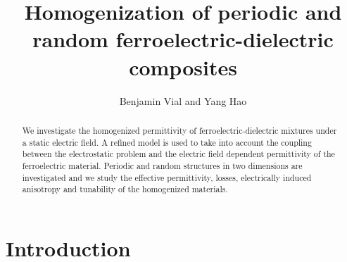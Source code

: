 \documentclass[%
 reprint,
 amsmath,amssymb,
 aps,
]{revtex4-2}
\begin{document}
\title{Homogenization of periodic and random ferroelectric-dielectric composites}


\author{Benjamin Vial and Yang Hao}



\begin{abstract}
We investigate the homogenized permittivity of ferroelectric-dielectric mixtures under
a static electric field. A refined model is used to take into account the coupling
between the electrostatic problem and the electric field dependent permittivity of the
ferroelectric material. Periodic and random structures in two dimensions are investigated and
we study the effective permittivity, losses, electrically induced anisotropy and tunability
 of the homogenized materials.
\end{abstract}




\maketitle



\section{Introduction}
\end{document}
